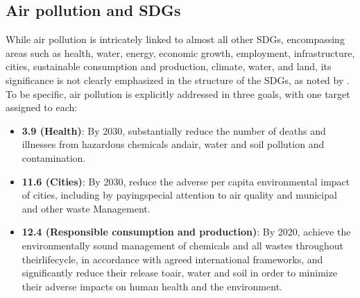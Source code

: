 \subsection{Air pollution and SDGs}
While air pollution is intricately linked to almost all other SDGs, encompassing areas such as health, water, energy, economic growth, employment, infrastructure, cities, sustainable consumption and production, climate, water, and land, its significance is not clearly emphasized in the structure of the SDGs, as noted by \citep{elder2016strengthening}. To be specific, air pollution is explicitly addressed in three goals, with one target assigned to each:
\begin{itemize}
    \item \textbf{3.9 (Health)}: By 2030, substantially reduce the number of deaths and illnesses from hazardous chemicals andair, water and soil pollution and contamination.
    \item \textbf{11.6 (Cities)}: By 2030, reduce the adverse per capita environmental impact of cities, including by payingspecial attention to air quality and municipal and other waste Management.
    \item \textbf{12.4 (Responsible consumption and production)}: By 2020, achieve the environmentally sound management of chemicals and all wastes throughout theirlifecycle, in accordance with agreed international frameworks, and significantly reduce their release toair, water and soil in order to minimize their adverse impacts on human health and the environment.
\end{itemize}

